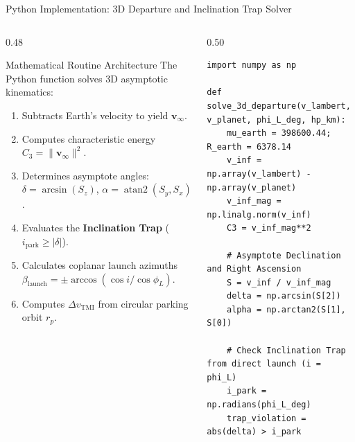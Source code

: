 \documentclass[aspectratio=169, 10pt]{beamer}
\begin{document}
\begin{frame}[fragile]{Python Implementation: 3D Departure and Inclination Trap Solver}
    \begin{columns}[t]
        \begin{column}{0.48\textwidth}
            \begin{block}{Mathematical Routine Architecture}
                \scriptsize
                The Python function solves 3D asymptotic kinematics:
                \begin{enumerate}\setlength{\itemsep}{1.5pt}
                    \item Subtracts Earth's velocity to yield $\mathbf{v}_\infty$.
                    \item Computes characteristic energy $C_3 = \|\mathbf{v}_\infty\|^2$.
                    \item Determines asymptote angles: $\delta = \arcsin(S_z)$, $\alpha = \operatorname{atan2}(S_y, S_x)$.
                    \item Evaluates the \textbf{Inclination Trap} ($i_{\text{park}} \ge |\delta|$).
                    \item Calculates coplanar launch azimuths $\beta_{\text{launch}} = \pm \arccos(\cos i / \cos \phi_L)$.
                    \item Computes $\Delta v_{\text{TMI}}$ from circular parking orbit $r_p$.
                \end{enumerate}
            \end{block}
        \end{column}

        \begin{column}{0.50\textwidth}
\begin{lstlisting}[style=pythoncode]
import numpy as np

def solve_3d_departure(v_lambert, v_planet, phi_L_deg, hp_km):
    mu_earth = 398600.44; R_earth = 6378.14
    v_inf = np.array(v_lambert) - np.array(v_planet)
    v_inf_mag = np.linalg.norm(v_inf)
    C3 = v_inf_mag**2
    
    # Asymptote Declination and Right Ascension
    S = v_inf / v_inf_mag
    delta = np.arcsin(S[2])
    alpha = np.arctan2(S[1], S[0])
    
    # Check Inclination Trap from direct launch (i = phi_L)
    i_park = np.radians(phi_L_deg)
    trap_violation = abs(delta) > i_park
    

\end{lstlisting}
\end{column}
\end{columns}
\end{frame}
\end{document}
